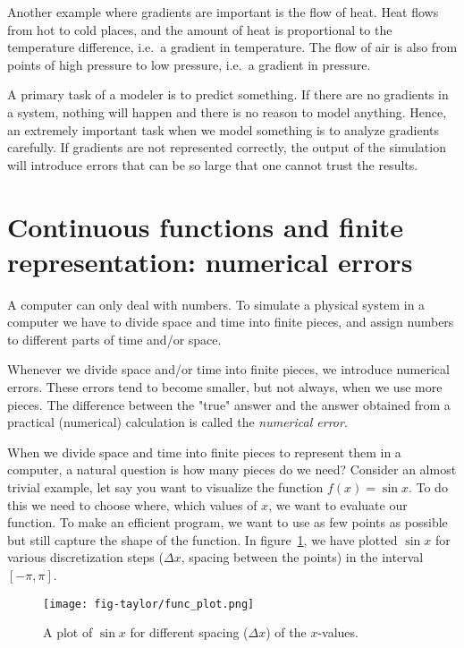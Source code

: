 \documentclass[graybox,sectrefs,envcountresetchap,open=right,final]{svmonodo}
\newenvironment{graybox2admon}[1][]{
\begin{graybox2mdframed}[frametitle=#1]
}
{
\end{graybox2mdframed}
}
\begin{document}
Another example where gradients are important is the flow of heat. Heat flows from hot to cold places, and the amount of heat is proportional to the temperature difference, i.e.~a gradient in temperature. The flow of air is also from points of high pressure to low pressure, i.e.~a gradient in pressure. 

A primary task of a modeler is to predict something. If there are no gradients in a system, nothing will happen and there is no reason to model anything. Hence, an extremely important task when we model something is to analyze gradients carefully. If gradients are not represented correctly, the output of the simulation will introduce errors that can be so large that one cannot trust the results.

\section{Continuous functions and finite representation: numerical errors}
A computer can only deal with numbers. To simulate a physical system in a computer we have to divide space and time into finite pieces, and assign numbers to different parts of time and/or space. 



\begin{graybox2admon}[Numerical errors]
Whenever we divide space and/or time into finite pieces, we introduce numerical errors. These errors tend to become smaller, but not always, when we use more pieces. The difference between the "true" answer and the answer obtained from a practical (numerical) calculation is called the \emph{numerical error}.
\end{graybox2admon}




When we divide space and time into finite pieces to represent them in a computer, a natural question is how many pieces do we need? Consider an almost trivial example, let say you want to visualize the function $f(x)=\sin x$. To do this we need to choose where, which values of $x$, we want to evaluate our function. To make an efficient program, we want to use as few points as possible but still capture the shape of the function.  
In figure~\ref{fig:taylor:sinx}, we have plotted $\sin x$ for various discretization steps ($\Delta x$, spacing between the points) in the interval $[-\pi,\pi]$.

\begin{figure}[!ht]  %
  \centerline{\texttt{[image: fig-taylor/func\_plot.png]}}
  \caption{
  A plot of $\sin x$ for different spacing ($\Delta x$) of the $x$-values. \label{fig:taylor:sinx}
  }
\end{figure}
\end{document}
